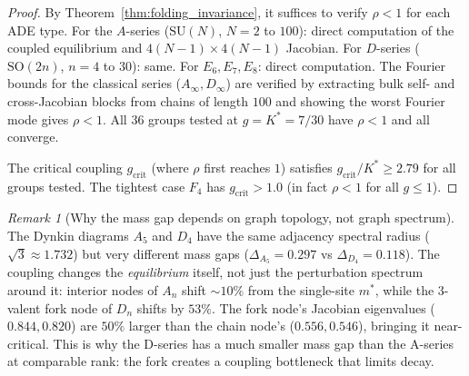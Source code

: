 \documentclass[11pt,a4paper]{article}
\theoremstyle{definition}
\theoremstyle{remark}
\newtheorem{remark}[theorem]{Remark}
\newcommand{\SU}{\mathrm{SU}}
\begin{document}
\begin{proof}
By Theorem~\ref{thm:folding_invariance}, it suffices to verify $\rho<1$ for each ADE type. For the $A$-series ($\SU(N)$, $N=2$ to $100$): direct computation of the coupled equilibrium and $4(N\!-\!1)\times 4(N\!-\!1)$ Jacobian. For $D$-series ($\mathrm{SO}(2n)$, $n=4$ to $30$): same. For $E_6,E_7,E_8$: direct computation. The Fourier bounds for the classical series ($A_\infty,D_\infty$) are verified by extracting bulk self- and cross-Jacobian blocks from chains of length $100$ and showing the worst Fourier mode gives $\rho<1$. All $36$ groups tested at $g=K^*=7/30$ have $\rho<1$ and all converge.

The critical coupling $g_{\mathrm{crit}}$ (where $\rho$ first reaches $1$) satisfies $g_{\mathrm{crit}}/K^*\geq 2.79$ for all groups tested. The tightest case $F_4$ has $g_{\mathrm{crit}}>1.0$ (in fact $\rho<1$ for all $g\leq 1$).
\end{proof}

\begin{remark}[Why the mass gap depends on graph topology, not graph spectrum]\label{rem:topology}
The Dynkin diagrams $A_5$ and $D_4$ have the same adjacency spectral radius ($\sqrt{3}\approx 1.732$) but very different mass gaps ($\Delta_{A_5}=0.297$ vs $\Delta_{D_4}=0.118$). The coupling changes the \emph{equilibrium} itself, not just the perturbation spectrum around it: interior nodes of $A_n$ shift $\sim 10\%$ from the single-site $m^*$, while the $3$-valent fork node of $D_n$ shifts by $53\%$. The fork node's Jacobian eigenvalues ($0.844, 0.820$) are $50\%$ larger than the chain node's ($0.556, 0.546$), bringing it near-critical. This is why the D-series has a much smaller mass gap than the A-series at comparable rank: the fork creates a coupling bottleneck that limits decay.
\end{remark}
\end{document}
